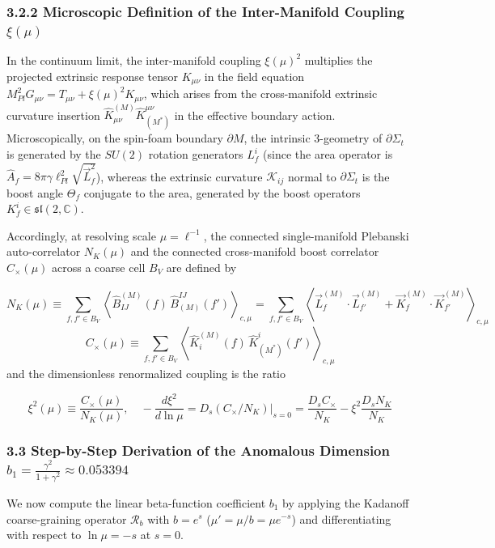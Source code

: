 \documentclass[aps,prd,onecolumn,superscriptaddress,nofootinbib,longbibliography,10pt]{revtex4-2}
\begin{document}
  
\subsubsection*{3.2.2 Microscopic Definition of the Inter-Manifold Coupling \(\xi(\mu)\)}

  In the continuum limit, the inter-manifold coupling \(\xi(\mu)^2\) multiplies the projected extrinsic response tensor \(K_{\mu\nu}\) in the field equation \(M_{Pl}^2 G_{\mu\nu} = T_{\mu\nu} + \xi(\mu)^2 K_{\mu\nu}\), which arises from the cross-manifold extrinsic curvature insertion \(\hat{K}_{\mu\nu}^{(M)}\hat{K}_{(M^*)}^{\mu\nu}\) in the effective boundary action. Microscopically, on the spin-foam boundary \(\partial M\), the intrinsic 3-geometry of \(\partial\Sigma_t\) is generated by the \(SU(2)\) rotation generators \(L_f^i\) (since the area operator is \(\hat{A}_f = 8\pi\gamma\ell_{Pl}^2\sqrt{\vec{L}_f^2}\)), whereas the extrinsic curvature \(\mathcal{K}_{ij}\) normal to \(\partial\Sigma_t\) is the boost angle \(\Theta_f\) conjugate to the area, generated by the boost operators \(K_f^i \in \mathfrak{sl}(2,\mathbb{C})\).


  Accordingly, at resolving scale \(\mu = \ell^{-1}\), the connected single-manifold Plebanski auto-correlator \(N_K(\mu)\) and the connected cross-manifold boost correlator \(C_\times(\mu)\) across a coarse cell \(B_V\) are defined by


  \[ N_K(\mu) \equiv \sum_{f,f'\in B_V} \left\langle \hat{B}_{IJ}^{(M)}(f)\,\hat{B}_{(M)}^{IJ}(f') \right\rangle_{c,\mu} = \sum_{f,f'\in B_V} \left\langle \vec{L}_f^{(M)}\cdot\vec{L}_{f'}^{(M)} + \vec{K}_f^{(M)}\cdot\vec{K}_{f'}^{(M)} \right\rangle_{c,\mu} \]
  \[ C_\times(\mu) \equiv \sum_{f,f'\in B_V} \left\langle \hat{K}_i^{(M)}(f)\,\hat{K}_{(M^*)}^i(f') \right\rangle_{c,\mu} \]
  and the dimensionless renormalized coupling is the ratio


  \[ \xi^2(\mu) \equiv \frac{C_\times(\mu)}{N_K(\mu)}, \quad -\frac{d\xi^2}{d\ln\mu} = \left. D_s(C_\times/N_K)\right|_{s=0} = \frac{D_s C_\times}{N_K} - \xi^2\frac{D_s N_K}{N_K} \]
  
  
\subsubsection*{3.3 Step-by-Step Derivation of the Anomalous Dimension \(b_1 = \frac{\gamma^2}{1+\gamma^2} \approx 0.053394\)}

  We now compute the linear beta-function coefficient \(b_1\) by applying the Kadanoff coarse-graining operator \(\mathcal{R}_b\) with \(b = e^s\) (\(\mu' = \mu/b = \mu e^{-s}\)) and differentiating with respect to \(\ln\mu = -s\) at \(s = 0\).
\end{document}
